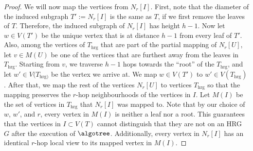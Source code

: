 \documentclass[letterpaper,11pt]{article}
\newcommand{\1}{\mathbb I}
\begin{document}
\begin{proof}
We will now map the vertices from $N_{r}[I]$. First, note that the diameter of the induced subgraph $T':= N_{r}[I]$ is the same as $T$, if we first remove the leaves of $T$. Therefore, the induced subgraph of $N_{r}[I]$ has height $h-1$. Now let $w\in V(T')$ be the unique vertex that is at distance $h-1$ from every leaf of $T'$. Also, among the vertices of $T_{\text{hrg}}$ that are part of the partial mapping of $N_{r}[U]$, let $v\in M(U)$ be one of the vertices that are furthest away from the leaves in $T_{\text{hrg}}$. Starting from $v$, we traverse $h-1$ hops towards the ``root'' of the $T_{\text{hrg}}$, and let $w'\in V(T_{\text{hrg})}$ be the vertex we arrive at. We map $w\in V(T')$ to $w'\in V(T_{\text{hrg}})$. After that, we map the rest of the vertices $N_{r}[U]$ to vertices $T_{\text{hrg}}$ so that the mapping preserves the $r$-hop neighbourhoods of the vertices in $I$. Let $M(I)$ be the set of vertices in $T_{\text{hrg}}$ that $N_{r}[I]$ was mapped to.
Note that by our choice of $w$, $w'$, and $r$, every vertex in $M(I)$ is neither a leaf nor a root. This guarantees that the vertices in $I \subset V(T)$ cannot distinguish that they are not on an HRG $G$ after the execution of $\algotree$. Additionally, every vertex in $N_{r}[I]$ has an identical $r$-hop local view to its mapped vertex in $M(I)$.


\end{proof}
\end{document}

